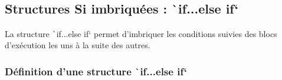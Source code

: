\documentclass[10pt]{article}
\begin{document}
\label{ifElseSansAccolades}

\subsection{Structures Si imbriquées : \texttt`if...else if`}
La structure \texttt`if...else if` permet d'imbriquer les conditions suivies des blocs d'exécution les uns à la suite des autres.

\subsubsection{Définition d'une structure \texttt`if...else if`}

\smallskip
\end{document}
